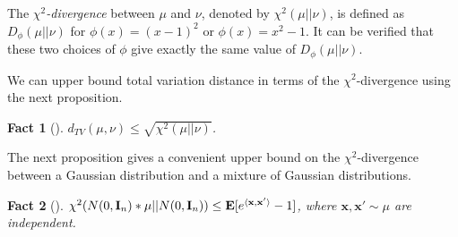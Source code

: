 \documentclass[11pt]{article}
\newcommand{\mat}[1]{{\ensuremath{\bm{\mathrm{#1}}}}}
\def\matI{\mat{I}}
\def\x{{\mathbf x}}
\newtheorem{fact}{Fact}
\begin{document}
The \textit{$\chi^2$-divergence} between $\mu$ and $\nu$, denoted by $\chi^2(\mu||\nu)$, 
is defined as $D_\phi(\mu||\nu)$ for $\phi(x) = (x-1)^2$ or $\phi(x) = x^2-1$. 
It can be verified that these two choices of $\phi$ give exactly the same value of $D_\phi(\mu||\nu)$.

We can upper bound total variation distance in terms of the $\chi^2$-divergence using the next proposition.
\begin{fact}[{\cite[p90]{Tsybakov}}] \label{prop:TV_chi^2}
$d_{TV}(\mu,\nu) \leq \sqrt{\chi^2(\mu||\nu)}$.
\end{fact}

The next proposition gives a convenient upper bound on the $\chi^2$-divergence between a Gaussian distribution
and a mixture of Gaussian distributions. 
\begin{fact}[{\cite[p97]{IS}}] \label{prop:chi^2}
$\chi^2(N(0,\matI_n)\ast \mu||N(0,\matI_n)) \leq {\bf E}[e^{\langle \x,\x'\rangle}-1]$, where $\x,\x'\sim \mu$ are independent.
\end{fact}
\end{document}
